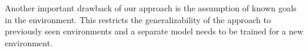  Another important drawback of our
approach is the assumption of known goals in the environment. This
restricts the generalizability of the approach to previously seen
environments and a separate model needs to be trained for a new
environment.




